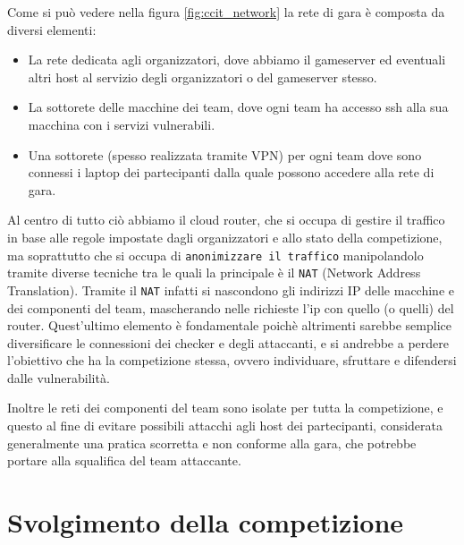 Come si può vedere nella figura \ref{fig:ccit_network} la rete di gara è composta da diversi elementi:
\begin{itemize}
    \setlength{\itemsep}{5pt}
    \setlength{\parskip}{5pt}
    \item La rete dedicata agli organizzatori, dove abbiamo il gameserver ed eventuali altri host al servizio degli organizzatori o del gameserver stesso.
    \item La sottorete delle macchine dei team, dove ogni team ha accesso ssh alla sua macchina con i servizi vulnerabili.
    \item Una sottorete (spesso realizzata tramite VPN) per ogni team dove sono connessi i laptop dei partecipanti dalla quale possono accedere alla rete di gara.
\end{itemize}

Al centro di tutto ciò abbiamo il cloud router, che si occupa di gestire il traffico in base alle regole impostate dagli organizzatori e allo stato della competizione, ma
soprattutto che si occupa di \texttt{anonimizzare il traffico} manipolandolo tramite diverse tecniche tra le quali la principale è il \texttt{NAT} (Network Address Translation).
Tramite il \texttt{NAT} infatti si nascondono gli indirizzi IP delle macchine e dei componenti del team, mascherando nelle richieste l'ip con quello (o quelli) del router.
Quest'ultimo elemento è fondamentale poichè altrimenti sarebbe semplice diversificare le connessioni dei checker e degli attaccanti, e si andrebbe a perdere l'obiettivo che ha
la competizione stessa, ovvero individuare, sfruttare e difendersi dalle vulnerabilità.

Inoltre le reti dei componenti del team sono isolate per tutta la competizione, e questo al fine di evitare possibili attacchi agli host dei partecipanti,
considerata generalmente una pratica scorretta e non conforme alla gara, che potrebbe portare alla squalifica del team attaccante.\\

\section{Svolgimento della competizione}

